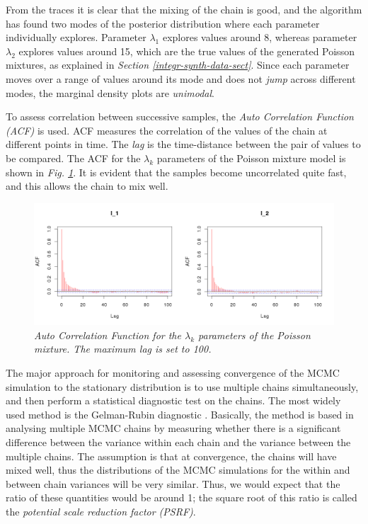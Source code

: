 From the traces it is clear that the mixing of the chain is good, and the algorithm has found two modes of the posterior distribution where each parameter individually explores. Parameter $\lambda_{1}$ explores values around 8, whereas parameter $\lambda_{2}$ explores values around 15, which are the true values of the generated Poisson mixtures, as explained in \emph{Section \ref{integr-synth-data-sect}}. Since each parameter moves over a range of values around its mode and does not \emph{jump} across different modes, the marginal density plots are \emph{unimodal}.

To assess correlation between successive samples, the \emph{Auto Correlation Function (ACF)} is used. ACF measures the correlation of the values of the chain at different points in time. The \emph{lag} is the time-distance between the pair of values to be compared. The ACF for the $\lambda_{k}$ parameters of the Poisson mixture model is shown in \emph{Fig. \ref{acfL-pic}}. It is evident that the samples become uncorrelated quite fast, and this allows the chain to mix well.
\begin{figure}[!ht]
\begin{center}
 \includegraphics[scale = 0.40]{images/acfL.png}
\caption{\emph{Auto Correlation Function for the $\lambda_{k}$ parameters of the Poisson mixture. The maximum lag is set to 100.}}
\label{acfL-pic}
\end{center}
\end{figure}

The major approach for monitoring and assessing convergence of the MCMC simulation to the stationary distribution is to use multiple chains simultaneously, and then perform a statistical diagnostic test on the chains. The most widely used method is the Gelman-Rubin diagnostic \citep{Gelman1992, Brooks1997}. Basically, the method is based in analysing multiple MCMC chains by measuring whether there is a significant difference between the variance within each chain and the variance between the multiple chains. The assumption is that at convergence, the chains will have mixed well, thus the distributions of the MCMC simulations for the within and between chain variances will be very similar. Thus, we would expect that the ratio of these quantities would be around 1; the square root of this ratio is called the \emph{potential scale reduction factor (PSRF)}. 

